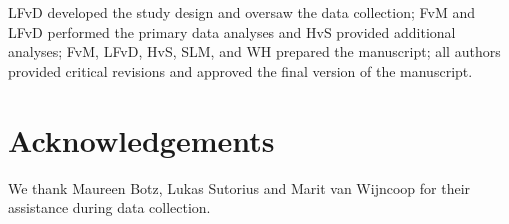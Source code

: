 \documentclass[authordate, empirical]{jote-new-article}
\begin{document}
LFvD developed the study design and oversaw the data collection; FvM and LFvD performed the primary data analyses and HvS provided additional analyses; FvM, LFvD, HvS, SLM, and WH prepared the manuscript; all authors provided critical revisions and approved the final version of the manuscript.


\section{Acknowledgements}



We thank Maureen Botz, Lukas Sutorius and Marit van Wijncoop for their assistance during data collection.


\printbibliography


















\end{document}
